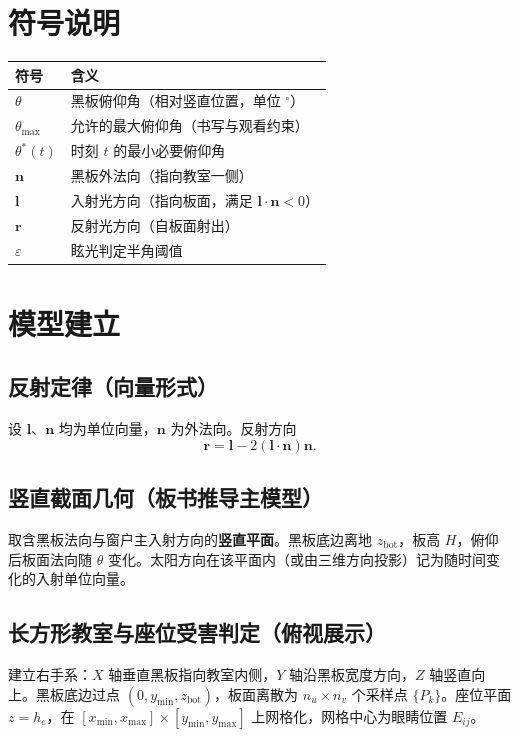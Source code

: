 \documentclass[UTF8,a4paper,12pt]{ctexart}
\begin{document}
\section{符号说明}
\begin{table}[htbp]
\centering
\begin{tabular}{@{}ll@{}}
\toprule
符号 & 含义 \\
\midrule
$\theta$ & 黑板俯仰角（相对竖直位置，单位 $^\circ$） \\
$\theta_{\max}$ & 允许的最大俯仰角（书写与观看约束） \\
$\theta^\ast(t)$ & 时刻 $t$ 的最小必要俯仰角 \\
$\mathbf{n}$ & 黑板外法向（指向教室一侧） \\
$\mathbf{l}$ & 入射光方向（指向板面，满足 $\mathbf{l}\cdot\mathbf{n}<0$） \\
$\mathbf{r}$ & 反射光方向（自板面射出） \\
$\varepsilon$ & 眩光判定半角阈值 \\
\bottomrule
\end{tabular}
\end{table}

\section{模型建立}

\subsection{反射定律（向量形式）}
设 $\mathbf{l}$、$\mathbf{n}$ 均为单位向量，$\mathbf{n}$ 为外法向。反射方向
\begin{equation}
  \mathbf{r}=\mathbf{l}-2(\mathbf{l}\cdot\mathbf{n})\mathbf{n}.
\end{equation}

\subsection{竖直截面几何（板书推导主模型）}
取含黑板法向与窗户主入射方向的\textbf{竖直平面}。黑板底边离地 $z_{\mathrm{bot}}$，板高 $H$，俯仰后板面法向随 $\theta$ 变化。太阳方向在该平面内（或由三维方向投影）记为随时间变化的入射单位向量。

\subsection{长方形教室与座位受害判定（俯视展示）}
建立右手系：$X$ 轴垂直黑板指向教室内侧，$Y$ 轴沿黑板宽度方向，$Z$ 轴竖直向上。黑板底边过点 $(0,y_{\min},z_{\mathrm{bot}})$，板面离散为 $n_u\times n_v$ 个采样点 $\{P_k\}$。座位平面 $z=h_e$，在 $[x_{\min},x_{\max}]\times[y_{\min},y_{\max}]$ 上网格化，网格中心为眼睛位置 $E_{ij}$。
\end{document}
